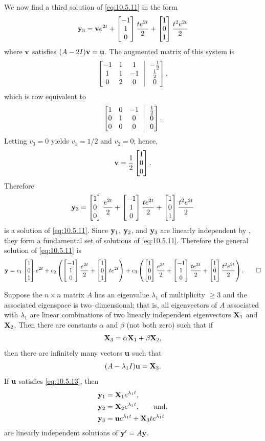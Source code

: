 \begin{solution}
We  now find a third solution of  \eqref{eq:10.5.11}  in the form
\[
\mathbf{y}_3=\mathbf{v}e^{2t}+\begin{bmatrix}-1\\1\\0\end{bmatrix}\frac{te^{2t}}{2}+\begin{bmatrix}1\\0\\1\end{bmatrix}\frac{t^2e^{2t}}{2}
\]
where $\mathbf{v}$ satisfies $(A-2I)\mathbf{v}=\mathbf{u}$.
The  augmented matrix  of this system is
\[
\amatrix{-1&1&1\\1&1&-1\\0&2&0}{-\frac12\\\frac12\\0},
\]
which is row equivalent to
\[
\amatrix{1&0&-1\\0&1&0\\0&0&0}{\frac12\\0\\0}.
\]
Letting $v_3=0$ yields $v_1=1/2$ and $v_2=0$; hence,
\[
\mathbf{v}=\frac{1}{2}\begin{bmatrix}1\\0\\0\end{bmatrix}.
\]
Therefore
\[
\mathbf{y}_3=\begin{bmatrix}1\\0\\0\end{bmatrix}\frac{e^{2t}}{2}+
\begin{bmatrix}-1\\1\\0\end{bmatrix}\frac{te^{2t}}{2}+\begin{bmatrix}1\\0\\1\end{bmatrix}\frac{t^2e^{2t}}{2}
\]
is a solution of  \eqref{eq:10.5.11}. Since $\mathbf{y}_1$, $\mathbf{y}_2$, and
$\mathbf{y}_3$ are linearly independent by , they
form a fundamental set of solutions of \eqref{eq:10.5.11}. Therefore the
general solution of \eqref{eq:10.5.11} is
\[
\mathbf{y}
=c_1\begin{bmatrix}1\\0\\1\end{bmatrix}e^{2t}
+c_2\left(\begin{bmatrix}-1\\1\\0\end{bmatrix}\frac{e^{2t}}{2}+\begin{bmatrix}1\\0\\1\end{bmatrix}te^{2t}\right)
+c_3\left(\begin{bmatrix}1\\0\\0\end{bmatrix}\frac{e^{2t}}{2}+
\begin{bmatrix}-1\\1\\0\end{bmatrix}\frac{te^{2t}}{2}+\begin{bmatrix}1\\0\\1\end{bmatrix}\frac{t^2e^{2t}}{2}\right).\qedhere
\]
\end{solution}


\begin{theorem}\label{thmtype:10.5.3}
Suppose the $n\times n$ matrix $A$ has an eigenvalue $\lambda_1$ of
multiplicity $\ge 3$ and the associated eigenspace is
two--dimensional; that is, all eigenvectors of $A$ associated with
$\lambda_1$ are linear combinations of two linearly independent
eigenvectors $\mathbf{X}_1$ and $\mathbf{X}_2$. Then there are constants
$\alpha$ and $\beta$ (not both zero) such that if
\begin{equation}\label{eq:10.5.12}
\mathbf{X}_3=\alpha\mathbf{X}_1+\beta\mathbf{X}_2,
\end{equation}
then there are infinitely many vectors $\mathbf{u}$ such that
\begin{equation}\label{eq:10.5.13}
(A-\lambda_1I)\mathbf{u}=\mathbf{X}_3.
\end{equation}
If $\mathbf{u}$ satisfies  \eqref{eq:10.5.13}, then
\[\begin{aligned}
\mathbf{y}_1&=\mathbf{X}_1 e^{\lambda_1t},\\
\mathbf{y}_2&=\mathbf{X}_2e^{\lambda_1t},\qquad\text{and}\\
\mathbf{y}_3&=\mathbf{u}e^{\lambda_1t}+\mathbf{X}_3te^{\lambda_1t}
\end{aligned}
\label{eq:10.5.14},
\]
are linearly independent solutions of  $\mathbf{y}'=A\mathbf{y}$.
\end{theorem}

